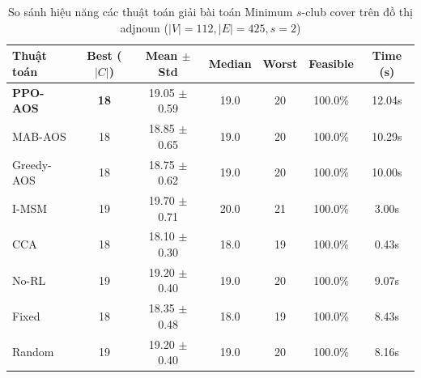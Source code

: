 \begin{table}[htbp]
\centering
\caption{So sánh hiệu năng các thuật toán giải bài toán Minimum $s$-club cover trên đồ thị adjnoun ($|V|=112, |E|=425, s=2$)}
\label{tab:results_adjnoun}
\begin{tabular}{lcccccc}
\hline
\textbf{Thuật toán} & \textbf{Best ($|C|$)} & \textbf{Mean $\pm$ Std} & \textbf{Median} & \textbf{Worst} & \textbf{Feasible} & \textbf{Time (s)} \\
\hline
\textbf{PPO-AOS} & \textbf{18} & 19.05 $\pm$ 0.59 & 19.0 & 20 & 100.0\% & 12.04s \\
MAB-AOS & 18 & 18.85 $\pm$ 0.65 & 19.0 & 20 & 100.0\% & 10.29s \\
Greedy-AOS & 18 & 18.75 $\pm$ 0.62 & 19.0 & 20 & 100.0\% & 10.00s \\
I-MSM & 19 & 19.70 $\pm$ 0.71 & 20.0 & 21 & 100.0\% & 3.00s \\
CCA & 18 & 18.10 $\pm$ 0.30 & 18.0 & 19 & 100.0\% & 0.43s \\
No-RL & 19 & 19.20 $\pm$ 0.40 & 19.0 & 20 & 100.0\% & 9.07s \\
Fixed & 18 & 18.35 $\pm$ 0.48 & 18.0 & 19 & 100.0\% & 8.43s \\
Random & 19 & 19.20 $\pm$ 0.40 & 19.0 & 20 & 100.0\% & 8.16s \\
\hline
\end{tabular}
\end{table}
